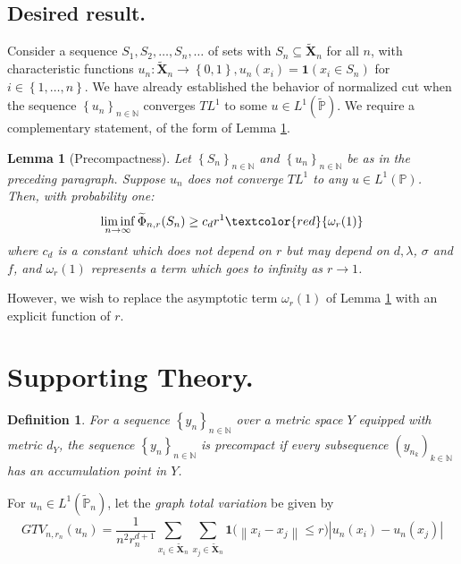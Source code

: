 \documentclass{article}
\newcommand{\norm}[1]{\left\lVert#1\right\rVert}
\newcommand{\abs}[1]{\left \lvert #1 \right \rvert}
\newcommand{\set}[1]{\left\{#1\right\}}
\newcommand{\seq}[1]{\set{#1}_{n \in \N}}
\newcommand{\Naturals}{\mathbb{N}}
\newcommand{\N}{\mathbb{N}}
\newcommand{\Xbf}{\mathbf{X}}
\newcommand{\Pbb}{\mathbb{P}}
\newcommand{\1}{\mathbf{1}}
\theoremstyle{alden}
\newtheorem{definition}{Definition}[section]
\theoremstyle{aldenthm}
\newtheorem{lemma}{Lemma}
\theoremstyle{remark}
\begin{document}
\subsection{Desired result.}

Consider a sequence $S_1,S_2,\ldots,S_n,\ldots$ of sets with $S_n \subseteq \widetilde{\Xbf}_n$ for all $n$, with characteristic functions $u_n: \widetilde{\Xbf}_n \to \set{0,1}, u_n(x_i) = \1(x_i \in S_n)$ for $i \in \set{1, \ldots,n}$. We have already established the behavior of normalized cut when the sequence $\seq{u_n}$ converges $TL^1$ to some $u \in L^1(\widetilde{\Pbb})$. We require a complementary statement, of the form of Lemma \ref{lem: precompactness}.

\begin{lemma}[Precompactness]
	\label{lem: precompactness}
	Let $\seq{S_n}$ and $\seq{u_n}$ be as in the preceding paragraph. Suppose $u_n$ does not converge $TL^1$ to any $u \in L^1(\Pbb)$. Then, with probability one:
	\begin{equation*}
	\liminf_{n \to \infty} \widetilde{\Phi}_{n,r}(S_n) \geq c_d r^{1} \textcolor{red}{\omega_r(1)}
	\end{equation*}
	where $c_d$ is a constant which does not depend on $r$ but may depend on $d, \lambda$, $\sigma$ and $f$, and $\omega_r(1)$ represents a term which goes to infinity as $r \to 1$.
\end{lemma}
However, we wish to replace the asymptotic term $\omega_r(1)$ of Lemma \ref{lem: precompactness} with an explicit function of $r$. 

\section{Supporting Theory.}

\begin{definition}
	For a sequence $\seq{y_n}$ over a metric space $Y$ equipped with metric $d_Y$, the sequence $\seq{y_n}$ is \emph{precompact} if every subsequence $(y_{n_k})_{k \in \Naturals}$ has an accumulation point in $Y$. 
\end{definition}

For $u_n \in L^1(\widetilde{\Pbb}_n)$, let the \emph{graph total variation} be given by
\begin{equation*}
GTV_{n,r_n}(u_n) = \frac{1}{n^2 r_n^{d + 1}}  \sum_{x_i \in \widetilde{\Xbf}_n} \sum_{x_j \in \widetilde{\Xbf}_n} \1\bigl(\norm{x_i - x_j} \leq r\bigr) \abs{u_n(x_i) - u_n(x_j)}
\end{equation*}
\end{document}
